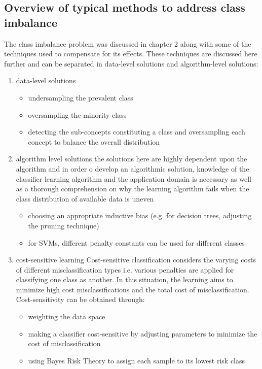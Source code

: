 \subsection{Overview of typical methods to address class imbalance}
The class imbalance problem was discussed in chapter 2 along with some of the techniques used to compensate for its effects. These techniques are discussed here further and can be separated in data-level solutions and algorithm-level solutions:
\begin{enumerate}
    \item data-level solutions\citep{Sun:2013it}
    \begin{itemize}
        \item undersampling the prevalent class 
        \item oversampling the minority class
        \item detecting the sub-concepts constituting a class and  oversampling each concept to balance the overall distribution
    \end{itemize}
    \item algorithm level solutions
    the solutions here are highly dependent upon the algorithm and in order o develop an algorithmic solution, knowledge of the classifier learning algorithm and the application domain is necessary as well as a thorough comprehension on why the learning algorithm fails when the class distribution of available data is uneven
    \begin{itemize}
        \item choosing an appropriate inductive bias (e.g. for decision trees, adjusting the pruning technique)
        \item for SVMs, different penalty constants can be used for different classes
    \end{itemize}
    \item cost-sensitive learning\citep{Sun:2013it}
    Cost-sensitive classification considers the varying costs of different misclassification types i.e. various penalties are applied for classifying one class as another. In this situation, the learning aims to minimize high cost misclassifications and the total cost of misclassification.
    Cost-sensitivity can be obtained through:
    \begin{itemize}
        \item weighting the data space
        \item making a classifier cost-sensitive by adjusting parameters to minimize the cost of misclassification
        \item using Bayes Risk Theory to assign each sample to its lowest risk class
    \end{itemize}
\end{enumerate}
